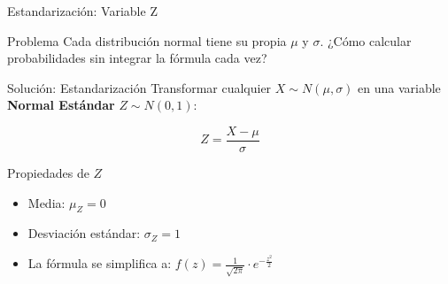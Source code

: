 \documentclass[10pt]{beamer}
\begin{document}
\begin{frame}{Estandarización: Variable Z}
\begin{block}{Problema}
Cada distribución normal tiene su propia $\mu$ y $\sigma$. ¿Cómo calcular probabilidades sin integrar la fórmula cada vez?
\end{block}

\vspace{0.3cm}
\begin{exampleblock}{Solución: Estandarización}
Transformar cualquier $X \sim N(\mu, \sigma)$ en una variable \textbf{Normal Estándar} $Z \sim N(0, 1)$:
\begin{center}
\Huge
$$\boxed{Z = \frac{X - \mu}{\sigma}}$$
\end{center}
\end{exampleblock}

\vspace{0.3cm}
\begin{block}{Propiedades de $Z$}
\begin{itemize}
  \item Media: $\mu_Z = 0$
  \item Desviación estándar: $\sigma_Z = 1$
  \item La fórmula se simplifica a: $\displaystyle f(z) = \frac{1}{\sqrt{2\pi}} \cdot e^{-\frac{z^2}{2}}$
\end{itemize}
\end{block}
\end{frame}
\end{document}
